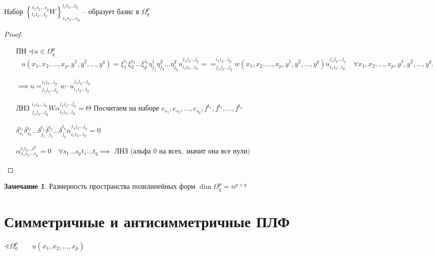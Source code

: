 \documentclass{book}
\theoremstyle{definition}
\newtheorem*{note}{Замечание}
\begin{document}
    \begin{theorem}
        Набор $\left\{ _{t_1 t_2 \ldots t_q}^{s_1 s_2 \ldots s_p} W \right\} _{s_1 s_2 \ldots s_p}^{t_1t_2 \ldots t_p} $ -- образует базис в $\Omega_q^p$
    \end{theorem}
    \begin{proof}
        \begin{itemize}
            \item []
            \item [ПН] $\sphericalangle u\in \Omega_q^p$
                \[
                    u\left( x_1, x_2, \ldots, x_p, y^1, y^2, \ldots, y^q \right)  = \xi_1^{i_1}\xi_2^{i_2}\ldots\xi_p^{i_p}\eta_{j_1}^1\eta_{j_2}^2\ldots\eta_{j_q}^qu_{i_1 i_2 \ldots i_p}^{j_1 j_2 \ldots j_q}=

                    = _{j_1 j_2 \ldots j_q}^{i_1 i_2 \ldots i_p}w\left( x_1, x_2, \ldots, x_p, y^1, y^2, \ldots, y^q  \right) u_{i_1 i_2 \ldots i_p}^{j_1 j_2 \ldots j_q}\quad \forall x_1, x_2, \ldots, x_p, y^1, y^2, \ldots, y^q
                .\] 

                $\implies u = _{j_1 j_2 \ldots j_q}^{i_1 i_2 \ldots i_p}w\cdot u_{i_1 i_2 \ldots i_p}^{j_1 j_2 \ldots j_q}$

            \item [ЛНЗ] $_{j_1 j_2 \ldots j_q}^{i_1 i_2 \ldots i_p}W\alpha_{i_1 i_2 \ldots i_p}^{j_1 j_2 \ldots j_q} = \Theta$ Посчитаем на наборе $e_{s_1}, e_{s_2}, \ldots, e_{s_p}, f^{t_1}, f^{t_2}, \ldots, f^{t_q}$

                $\delta_{s_1}^{i_1}\delta_{s_2}^{i_2}\ldots\delta_{j_1}^{t_1}\delta_{j_2}^{t_2}\ldots\delta_{j_q}^{t_q}\alpha_{i_1 i_2 \ldots i_p}^{j_1 j_2 \ldots j_q} = 0$

                $\alpha_{s_1 s_2 \ldots s_p}^{t_1 t_2 \ldots t^q} = 0\quad \forall s_1 \ldots s_p t_1 \ldots t_q \implies $ ЛНЗ (альфа 0 на всех, значит она все нули)
        \end{itemize}
    \end{proof}

    \begin{note}
        Размерность пространства полилинейных форм $\dim \Omega_q^p = n^{p+q}$
    \end{note}

    \section{Симметричные и антисимметричные ПЛФ}

    $\sphericalangle \Omega_0^p\qquad u\left( x_1, x_2, \ldots, x_p \right) $ 
\end{document}
